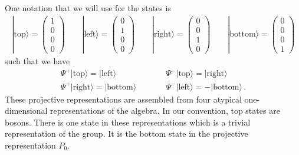 \documentclass[12pt]{article}
\numberwithin{equation}{section}
\numberwithin{equation}{section}
\numberwithin{table}{section}\setlength{\multlinegap}{25pt}
\begin{document}
One notation that we will use for the states is
\begin{eqnarray}
| \mbox{top} \rangle =  \left( \begin{array}{c}
         1 \\ 0 \\ 0 \\ 0  
       \end{array}  \right)
\qquad
| \mbox{left} \rangle =  \left( \begin{array}{c}
         0 \\ 1 \\ 0 \\ 0  
       \end{array}  \right)
\qquad
| \mbox{right} \rangle =  \left( \begin{array}{c}
         0 \\ 0 \\ 1 \\ 0  
       \end{array}  \right)
\qquad
| \mbox{bottom} \rangle =  \left( \begin{array}{c}
         0 \\ 0 \\ 0 \\ 1  
       \end{array}  \right)
\end{eqnarray}
such that we have
\begin{eqnarray}
\Psi^+ | \mbox{top} \rangle =  | \mbox{left} \rangle
& \qquad &
\Psi^- | \mbox{top} \rangle = | \mbox{right} \rangle
\nonumber \\
\Psi^+ | \mbox{right} \rangle = | \mbox{bottom} \rangle
& \qquad &
\Psi^- | \mbox{left} \rangle = - | \mbox{bottom} \rangle \, .
\end{eqnarray}
These projective representations are assembled from four atypical one-dimensional
representations of the algebra. In our convention, top states are bosons.
There is one state in these representations which is a trivial representation of the group.
It is the bottom state in the projective representation $P_0$. 
\end{document}
